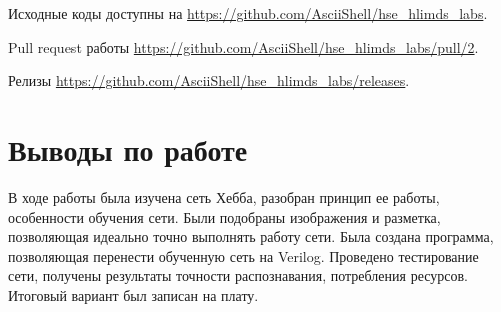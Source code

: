 \documentclass[a4paper,14pt]{article}
\begin{document}
    Исходные коды доступны на \href{https://github.com/AsciiShell/hse_hlimds_labs}
    {https://github.com/AsciiShell/hse\_hlimds\_labs}.

    Pull request работы \href{https://github.com/AsciiShell/hse_hlimds_labs/pull/2}
    {https://github.com/AsciiShell/hse\_hlimds\_labs/pull/2}.

    Релизы \href{https://github.com/AsciiShell/hse_hlimds_labs/releases}
    {https://github.com/AsciiShell/hse\_hlimds\_labs/releases}.


    \section{Выводы по работе}
    В ходе работы была изучена сеть Хебба, разобран принцип ее работы, особенности обучения сети.
    Были подобраны изображения и разметка, позволяющая идеально точно выполнять работу сети.
    Была создана программа, позволяющая перенести обученную сеть на Verilog.
    Проведено тестирование сети, получены результаты точности распознавания, потребления ресурсов.
    Итоговый вариант был записан на плату.
\end{document}
